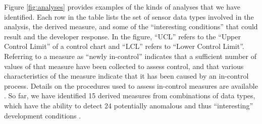 Figure \ref{fig:analyses} provides examples of the kinds of analyses that
we have identified.  Each row in the table lists the set of sensor data
types involved in the analysis, the derived measure, and some of the
``interesting conditions'' that could result and the developer response. In
the figure, ``UCL'' refers to the ``Upper Control Limit'' of a control
chart and ``LCL'' refers to ``Lower Control Limit''. Referring to a measure
as ``newly in-control'' indicates that a sufficient number of values of
that measure have been collected to assess control, and that various
characteristics of the measure indicate that it has been caused by an
in-control process. Details on the procedures used to assess in-control
measures are available \cite{Florac97,Wheeler95}.  So far, we have
identified 15 derived measures from combinations of data types, which 
have the ability to detect 24 potentially anomalous and thus
``interesting'' development conditions
\cite{csdl2-01-04}.

